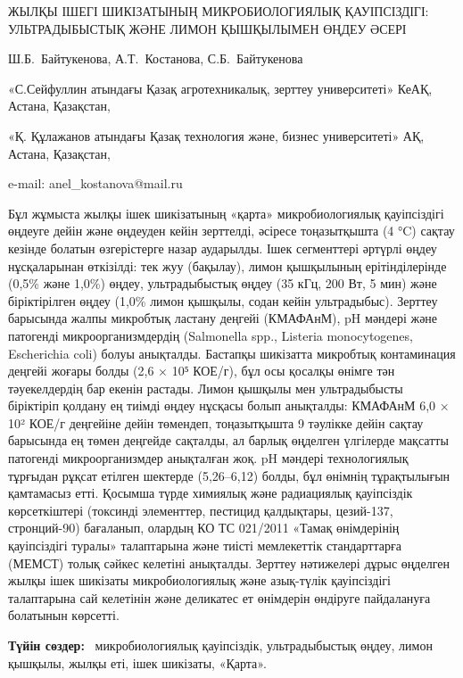 \begin{header}
ЖЫЛҚЫ ІШЕГІ ШИКІЗАТЫНЫҢ МИКРОБИОЛОГИЯЛЫҚ ҚАУІПСІЗДІГІ: УЛЬТРАДЫБЫСТЫҚ ЖӘНЕ ЛИМОН ҚЫШҚЫЛЫМЕН ӨҢДЕУ ӘСЕРІ

Ш.Б.~Байтукенова,
А.Т.~Костанова\envelope,
С.Б.~Байтукенова
\end{header}

\begin{affil}
«С.Сейфуллин атындағы Қазақ агротехникалық, зерттеу университеті» КеАҚ, Астана, Қазақстан,

«Қ. Құлажанов атындағы Қазақ технология және, бизнес университеті» АҚ, Астана, Қазақстан,

e-mail: anel\_kostanova@mail.ru
\end{affil}

Бұл жұмыста жылқы ішек шикізатының «қарта» микробиологиялық қауіпсіздігі
өңдеуге дейін және өңдеуден кейін зерттелді, әсіресе тоңазытқышта (4 °C)
сақтау кезінде болатын өзгерістерге назар аударылды. Ішек сегменттері
әртүрлі өңдеу нұсқаларынан өткізілді: тек жуу (бақылау), лимон
қышқылының ерітінділерінде (0,5\% және 1,0\%) өңдеу, ультрадыбыстық
өңдеу (35 кГц, 200 Вт, 5 мин) және біріктірілген өңдеу (1,0\% лимон
қышқылы, содан кейін ультрадыбыс). Зерттеу барысында жалпы микробтық
ластану деңгейі (КМАФАнМ), pH мәндері және патогенді микроорганизмдердің
(Salmonella spp., Listeria monocytogenes, Escherichia coli) болуы
анықталды. Бастапқы шикізатта микробтық контаминация деңгейі жоғары
болды (2,6 × 10⁵ КОЕ/г), бұл осы қосалқы өнімге тән тәуекелдердің бар
екенін растады. Лимон қышқылы мен ультрадыбысты біріктіріп қолдану ең
тиімді өңдеу нұсқасы болып анықталды: КМАФАнМ 6,0 × 10² КОЕ/г деңгейіне
дейін төмендеп, тоңазытқышта 9 тәулікке дейін сақтау барысында ең төмен
деңгейде сақталды, ал барлық өңделген үлгілерде мақсатты патогенді
микроорганизмдер анықталған жоқ. pH мәндері технологиялық тұрғыдан
рұқсат етілген шектерде (5,26--6,12) болды, бұл өнімнің тұрақтылығын
қамтамасыз етті. Қосымша түрде химиялық және радиациялық қауіпсіздік
көрсеткіштері (токсинді элементтер, пестицид қалдықтары, цезий-137,
стронций-90) бағаланып, олардың КО ТС 021/2011 «Тамақ өнімдерінің
қауіпсіздігі туралы» талаптарына және тиісті мемлекеттік стандарттарға
(МЕМСТ) толық сәйкес келетіні анықталды. Зерттеу нәтижелері дұрыс
өңделген жылқы ішек шикізаты микробиологиялық және азық-түлік
қауіпсіздігі талаптарына сай келетінін және деликатес ет өнімдерін
өндіруге пайдалануға болатынын көрсетті.

{\bfseries Түйін сөздер:} ~микробиологиялық қауіпсіздік, ультрадыбыстық
өңдеу, лимон қышқылы, жылқы еті, ішек шикізаты, «Қарта».

